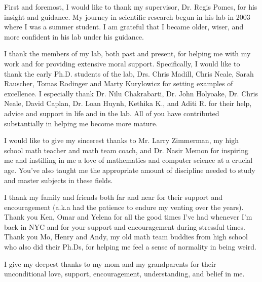 First and foremost, I would like to thank my supervisor, Dr. Regis Pomes, for his insight and guidance. My journey in scientific research begun in his lab in 2003 where I was a summer student.  I am grateful that I became older, wiser, and more confident in his lab under his guidance.

I thank the members of my lab, both past and present, for helping me with my work and for providing extensive moral support. Specifically, I would like to thank the early Ph.D. students of the lab, Drs. Chris Madill, Chris Neale, Sarah Rauscher, Tomas Rodinger and Marty Kurylowicz for setting examples of excellence. I especially thank Dr. Nilu Chakrabarti, Dr. John Holyoake, Dr. Chris Neale, David Caplan, Dr. Loan Huynh, Kethika K., and Aditi R. for their help, advice and support in life and in the lab. All of you have contributed substantially in helping me become more mature.

I would like to give my sincerest thanks to Mr. Larry Zimmerman, my high school math teacher and math team coach, and Dr. Nasir Memon for inspiring me and instilling in me a love of mathematics and computer science at a crucial age. You've also taught me the appropriate amount of discipline needed to study and master subjects in these fields.

I thank my family and friends both far and near for their support and encouragement (a.k.a had the patience to endure my venting over the years).  Thank you Ken, Omar and Yelena for all the good times I've had whenever I'm back in NYC and for your support and encouragement during stressful times. Thank you Mo, Henry and Andy, my old math team buddies from high school who also did their Ph.Ds, for helping me feel a sense of normality in being weird.

I give my deepest thanks to my mom and my grandparents for their unconditional love, support, encouragement, understanding, and belief in me.
